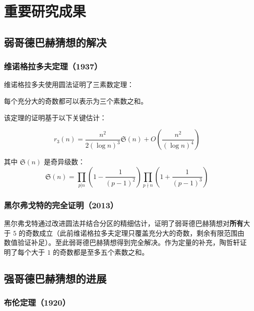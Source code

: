 \section{重要研究成果}\label{sec:results}

\subsection{弱哥德巴赫猜想的解决}

\subsubsection{维诺格拉多夫定理（1937）}

维诺格拉多夫使用圆法证明了三素数定理\cite{vinogradov1937representation}：

\begin{theorem}[三素数定理]
    每个充分大的奇数都可以表示为三个素数之和。
\end{theorem}

该定理的证明基于以下关键估计：

\begin{equation}
    r_3(n) = \frac{n^2}{2(\log n)^3} \mathfrak{S}(n) + O\left(\frac{n^2}{(\log n)^4}\right)
\end{equation}

其中 $\mathfrak{S}(n)$ 是奇异级数：
\begin{equation}
    \mathfrak{S}(n) = \prod_{p|n} \left(1 - \frac{1}{(p-1)^2}\right) \prod_{p \nmid n} \left(1 + \frac{1}{(p-1)^3}\right)
\end{equation}

\subsubsection{黑尔弗戈特的完全证明（2013）}

黑尔弗戈特通过改进圆法并结合分区的精细估计，证明了弱哥德巴赫猜想对\textbf{所有}大于 $5$ 的奇数成立\cite{helfgott2013ternary}（此前维诺格拉多夫定理只覆盖充分大的奇数，剩余有限范围由数值验证补足）。至此弱哥德巴赫猜想得到完全解决。作为定量的补充，陶哲轩证明了每个大于 $1$ 的奇数都是至多五个素数之和\cite{tao2014hardy}。

\subsection{强哥德巴赫猜想的进展}

\subsubsection{布伦定理（1920）}

